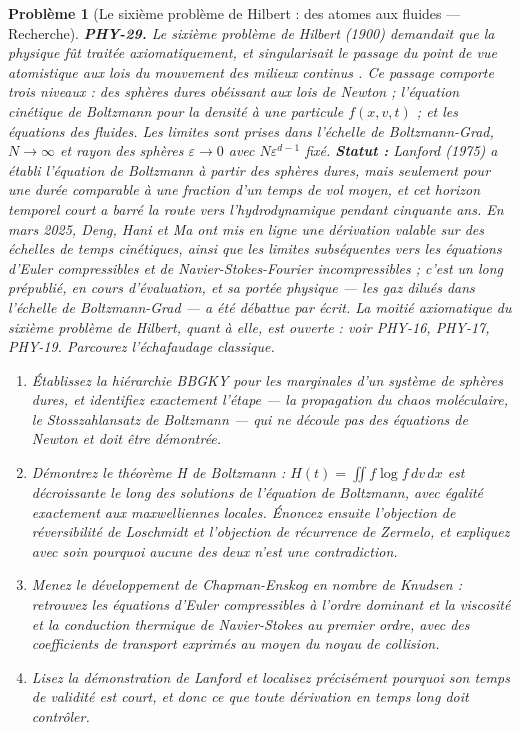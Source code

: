 \documentclass[11pt]{article}
\newtheorem{problem}{Problème}
\begin{document}
\bigskip

\begin{problem}[{Le sixième problème de Hilbert : des atomes aux fluides --- Recherche}]
\textbf{PHY-29.} Le sixième problème de Hilbert (1900) demandait que la physique fût traitée
axiomatiquement, et singularisait le passage \og{} du point de vue atomistique aux lois du mouvement
des milieux continus \fg{}. Ce passage comporte trois niveaux : des sphères dures obéissant aux lois
de Newton ; l'équation cinétique de Boltzmann pour la densité à une particule $f(x,v,t)$ ; et
les équations des fluides. Les limites sont prises dans l'échelle de Boltzmann-Grad,
$N \to \infty$ et rayon des sphères $\varepsilon \to 0$ avec $N\varepsilon^{d-1}$ fixé.
\textbf{Statut :} Lanford (1975) a établi l'équation de Boltzmann à partir des sphères dures, mais
seulement pour une durée comparable à une fraction d'un temps de vol moyen, et cet horizon
temporel court a barré la route vers l'hydrodynamique pendant cinquante ans. En mars 2025, Deng,
Hani et Ma ont mis en ligne une dérivation valable sur des échelles de temps cinétiques, ainsi que
les limites subséquentes vers les équations d'Euler compressibles et de
Navier-Stokes-Fourier incompressibles ; c'est un long prépublié, en cours d'évaluation, et sa
portée physique --- les gaz dilués dans l'échelle de Boltzmann-Grad --- a été débattue par écrit. La
moitié axiomatique du sixième problème de Hilbert, quant à elle, est ouverte : voir PHY-16,
PHY-17, PHY-19. Parcourez l'échafaudage classique.
\begin{enumerate}
\item[(a)] Établissez la hiérarchie BBGKY pour les marginales d'un système de sphères dures, et
identifiez exactement l'étape --- la propagation du chaos moléculaire, le
\textit{Stosszahlansatz} de Boltzmann --- qui ne découle pas des équations de Newton et doit être
démontrée.
\item[(b)] Démontrez le théorème H de Boltzmann : $H(t) = \iint f\log f\,dv\,dx$ est décroissante le
long des solutions de l'équation de Boltzmann, avec égalité exactement aux maxwelliennes locales.
Énoncez ensuite l'objection de réversibilité de Loschmidt et l'objection de récurrence de Zermelo,
et expliquez avec soin pourquoi aucune des deux n'est une contradiction.
\item[(c)] Menez le développement de Chapman-Enskog en nombre de Knudsen : retrouvez les équations
d'Euler compressibles à l'ordre dominant et la viscosité et la conduction thermique de
Navier-Stokes au premier ordre, avec des coefficients de transport exprimés au moyen du noyau de
collision.
\item[(d)] Lisez la démonstration de Lanford et localisez précisément pourquoi son temps de validité est
court, et donc ce que toute dérivation en temps long doit contrôler.
\end{enumerate}

\end{problem}
\end{document}
